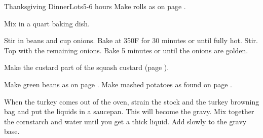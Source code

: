 \documentclass[../Cookbook.tex]{subfiles}
\begin{document}
\begin{recipe}{Thanksgiving Dinner}{Lots}{5-6 hours}
\newstep
Make rolls as on page \pageref{DinnerRolls}.

Mix in a  quart baking dish.

Stir in beans and  cup onions. Bake at 350\0F for 30 minutes or until fully hot. Stir.\\
Top with the remaining onions. Bake 5 minutes or until the onions are golden.

\newstep
Make the custard part of the squash custard (page \pageref{SquashCustard}).

\newstep
Make green beans as on page \pageref{CreamBeans}.
Make mashed potatoes as found on page \pageref{MashedPotatoes}.

When the turkey comes out of the oven, strain the stock and the turkey browning bag and put the liquids in a saucepan. This will become the gravy. Mix together the cornstarch and water until you get a thick liquid. Add slowly to the gravy base.

\end{recipe}
\end{document}
